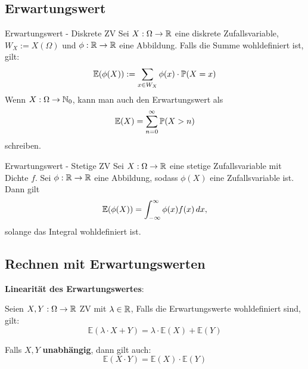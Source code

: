 \subsection{Erwartungswert}
\begin{mainbox}{Erwartungswert - Diskrete ZV}
    Sei $X: \Omega \to \R$ eine diskrete Zufallsvariable, $W_X := X(\Omega)$ und $\phi: \R \to \R$ eine Abbildung. Falls die Summe wohldefiniert ist, gilt: 
    $$\mathbb{E}(\phi(X)) := \sum_{x \in W_X} \phi(x) \cdot \P(X = x)$$
    Wenn $X: \Omega \to \N_0$, kann man auch den Erwartungswert als
    $$\mathbb{E}(X) = \sum_{n = 0}^{\infty}\P(X > n)$$
    schreiben.
\end{mainbox}
\begin{mainbox}{Erwartungswert - Stetige ZV}
    Sei $X: \Omega \to \R$ eine stetige Zufallsvariable mit Dichte $f$. Sei $\phi: \R \to \R$ eine Abbildung, sodass $\phi(X)$ eine Zufallsvariable ist. Dann gilt
    $$\mathbb{E}(\phi(X))= \int_{-\infty}^\infty \phi(x)f(x)\dx,$$
    solange das Integral wohldefiniert ist. 
\end{mainbox}

\subsection{Rechnen mit Erwartungswerten}
\textbf{Linearität des Erwartungswertes}: 

Seien $X, Y: \Omega \to \R$ ZV mit $\lambda \in \R$, Falls die Erwartungswerte wohldefiniert sind, gilt:
$$\mathbb{E}(\lambda \cdot X + Y) = \lambda \cdot \mathbb{E}(X) + \mathbb{E}(Y)$$

Falls $X, Y$ \textbf{unabhängig}, dann gilt auch:
$$\mathbb{E}(X \cdot Y) = \mathbb{E}(X) \cdot \mathbb{E}(Y)$$

